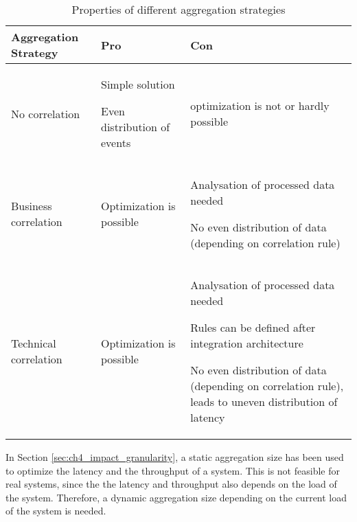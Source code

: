\begin{table}[htbp]
	\centering
	\begin{tabularx}{\textwidth}{@{} p{2cm} X X @{}}
		\caption{Properties of different aggregation strategies}\label{table:ch05_aggregation_strategies}\\
		\toprule
		\bfseries Aggregation Strategy & \centering\arraybackslash \bfseries Pro & \centering\arraybackslash \bfseries Con\\
		\midrule
		No correlation & \savespace
		\begin{titemize}
			\item Simple solution
			\item Even distribution of events
		\end{titemize} & \savespace
		\begin{titemize}
			\item optimization is not or hardly possible
		\end{titemize}\\
		\midrule
		Business correlation & \savespace
		\begin{titemize}
			\item Optimization is possible
		\end{titemize} & \savespace
		\begin{titemize}
			\item Analysation of processed data needed
			\item No even distribution of data (depending on correlation rule)
		\end{titemize}\\
		\midrule
		Technical correlation & \savespace
		\begin{titemize}
			\item Optimization is possible
		\end{titemize} & \savespace
		\begin{titemize}
			\item Analysation of processed data needed
			\item Rules can be defined after integration architecture
			\item No even distribution of data (depending on correlation rule), leads to uneven distribution of latency
		\end{titemize}\\
		\bottomrule
	\end{tabularx}
\end{table}

In Section \ref{sec:ch4_impact_granularity}, a static aggregation size has been used to optimize the latency and the throughput of a system.
This is not feasible for real systems, since the the latency and throughput also depends on the load of the system. Therefore, a dynamic aggregation size depending on the current load of the system is needed.

